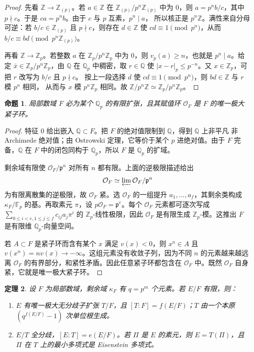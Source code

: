 \documentclass[11pt,a4paper,openany]{ctexbook}
\numberwithin{equation}{chapter}
\newcommand{\Q}{\mathbb{Q}}
\newcommand{\Z}{\mathbb{Z}}
\newcommand{\F}{\mathbb{F}}
\theoremstyle{plain}
\newtheorem{theorem}{定理}[chapter]
\newtheorem{proposition}[theorem]{命题}
\theoremstyle{definition}
\theoremstyle{remark}
\begin{document}
\begin{proof}
先看 $\Z\to\Z_{(p)}$。若 $a\in\Z$ 在 $\Z_{(p)}/p^n\Z_{(p)}$ 中为 $0$，则
$a=p^n b/c$，其中 $p\nmid c$。于是 $ca=p^n b$。由于 $c$ 与 $p$ 互素，$p^n\mid a$，
所以核正是 $p^n\Z$。满性来自分母可逆：若 $b/c\in\Z_{(p)}$ 且 $p\nmid c$，则存在
$d\in\Z$ 使 $cd\equiv1\pmod {p^n}$，从而
$b/c\equiv bd\pmod {p^n\Z_{(p)}}$。

再看 $\Z\to\Z_p$。若整数 $a$ 在 $\Z_p/p^n\Z_p$ 中为 $0$，则 $v_p(a)\ge n$，也就是
$p^n\mid a$。给定 $\bar x\in\Z_p/p^n\Z_p$，由 $\Q$ 在 $\Q_p$ 中稠密，取
$r\in\Q$ 使 $|x-r|_p\le p^{-n}$。又 $x\in\Z_p$，可把 $r$ 改写为 $b/c$ 且 $p\nmid c$。
按上一段选择 $d$ 使 $cd\equiv1\pmod {p^n}$，则 $bd\in\Z$ 与 $r$ 模 $p^n$ 相同，
从而与 $x$ 模 $p^n\Z_p$ 相同。故 $\Z/p^n\Z\simeq\Z_p/p^n\Z_p$。
\end{proof}

\begin{proposition}
局部数域 $F$ 必为某个 $\Q_p$ 的有限扩张，且其赋值环 $\mathcal O_F$ 是 $F$ 的唯一极大紧子环。
\end{proposition}

\begin{proof}
特征 $0$ 给出嵌入 $\Q\subset F$。把 $F$ 的绝对值限制到 $\Q$，得到 $\Q$ 上非平凡
非 Archimede 绝对值；由 Ostrowski 定理，它等价于某个 $p$ 进绝对值。由于 $F$
完备，$\Q$ 在 $F$ 中的闭包同构于 $\Q_p$，所以 $F$ 是 $\Q_p$ 的扩域。

剩余域有限使 $\mathcal O_F/\mathfrak p^n$ 对所有 $n$ 都有限。上面的逆极限描述给出
\[
\mathcal O_F\simeq\varprojlim\mathcal O_F/\mathfrak p^n
\]
为有限离散集的逆极限，故 $\mathcal O_F$ 紧。选 $\mathcal O_F$ 的一组提升
$a_1,\dots,a_f$，其剩余类构成 $\kappa_F/\F_p$ 的基。再取素元 $\pi$，设
$p\mathcal O_F=\mathfrak p^e$。每个 $\mathcal O_F$ 元素都可逐次写成
$\sum_{0\le i<e,1\le j\le f} c_{ij}a_j\pi^i$ 的 $\Z_p$-线性极限，因此
$\mathcal O_F$ 是有限生成 $\Z_p$-模。这推出 $F$ 是有限维 $\Q_p$-向量空间。

若 $A\subset F$ 是紧子环而含有某个 $x$ 满足 $v(x)<0$，则 $x^n\in A$ 且
$v(x^n)=nv(x)\to-\infty$。这组元素没有收敛子列，因为不同 $n$ 的元素越来越远离
$\mathcal O_F$ 的有界部分，和紧性矛盾。因此任意紧子环都包含在
$\mathcal O_F$ 中。既然 $\mathcal O_F$ 自身紧，它就是唯一极大紧子环。
\end{proof}

\begin{theorem}
设 $F$ 为局部数域，剩余域 $\kappa_F$ 有 $q=p^m$ 个元素。若 $E/F$ 有限，则：
\begin{enumerate}[label=(\arabic*)]
\item $E$ 有唯一极大无分歧子扩张 $T/F$，且 $[T:F]=f(E/F)$；$T$ 由一个本原 $(q^{f(E/F)}-1)$ 次单位根生成。
\item $E/T$ 全分歧，$[E:T]=e(E/F)$。若 $\Pi$ 是 $E$ 的素元，则 $E=T(\Pi)$，且 $\Pi$ 在 $T$ 上的最小多项式是 Eisenstein 多项式。
\end{enumerate}
\end{theorem}
\end{document}
